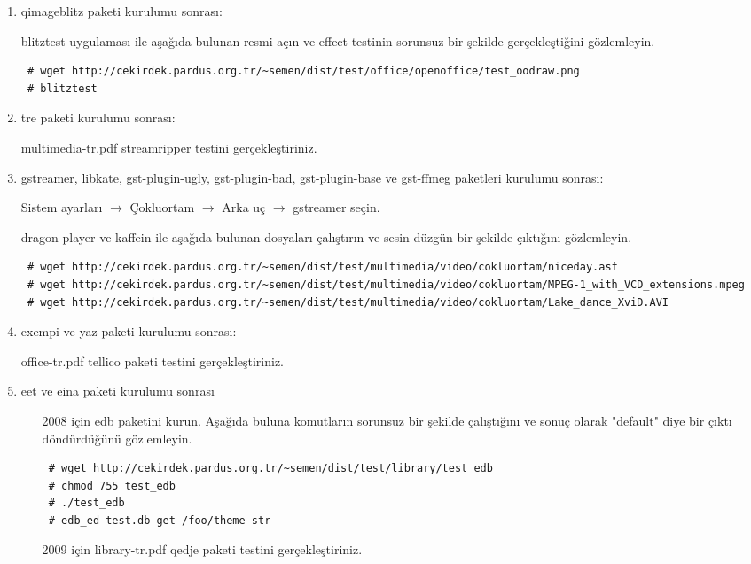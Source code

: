\documentclass[a4paper,10pt]{article}
\begin{document}
\begin{enumerate}
\item qimageblitz paketi kurulumu sonrası:

blitztest uygulaması ile aşağıda bulunan resmi açın ve effect testinin sorunsuz bir şekilde gerçekleştiğini gözlemleyin.
\begin{verbatim}
 # wget http://cekirdek.pardus.org.tr/~semen/dist/test/office/openoffice/test_oodraw.png
 # blitztest
\end{verbatim}


\item tre paketi kurulumu sonrası:

multimedia-tr.pdf streamripper testini gerçekleştiriniz.

\item gstreamer, libkate, gst-plugin-ugly, gst-plugin-bad, gst-plugin-base ve gst-ffmeg paketleri kurulumu sonrası:

Sistem ayarları $\rightarrow$ Çokluortam $\rightarrow$ Arka uç $\rightarrow$ gstreamer seçin. 

dragon player ve kaffein ile aşağıda bulunan dosyaları çalıştırın ve sesin düzgün bir şekilde çıktığını gözlemleyin.
\begin{verbatim}
 # wget http://cekirdek.pardus.org.tr/~semen/dist/test/multimedia/video/cokluortam/niceday.asf
 # wget http://cekirdek.pardus.org.tr/~semen/dist/test/multimedia/video/cokluortam/MPEG-1_with_VCD_extensions.mpeg
 # wget http://cekirdek.pardus.org.tr/~semen/dist/test/multimedia/video/cokluortam/Lake_dance_XviD.AVI
\end{verbatim}

\item exempi ve yaz paketi kurulumu sonrası:

office-tr.pdf tellico paketi testini gerçekleştiriniz.

\item eet ve eina paketi kurulumu sonrası
\begin{itemize}
 \item [2008 için] edb paketini kurun. Aşağıda buluna komutların sorunsuz bir şekilde çalıştığını ve sonuç olarak "default" diye bir çıktı döndürdüğünü gözlemleyin.
\begin{verbatim}
 # wget http://cekirdek.pardus.org.tr/~semen/dist/test/library/test_edb
 # chmod 755 test_edb
 # ./test_edb
 # edb_ed test.db get /foo/theme str
\end{verbatim}
\item [2009 için] library-tr.pdf qedje paketi testini gerçekleştiriniz.
\end{itemize}


\end{enumerate}
\end{document}
